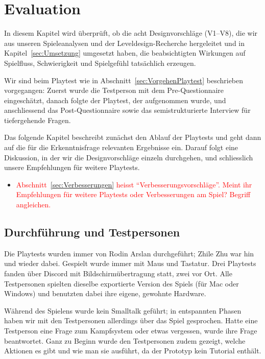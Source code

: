 \documentclass[../Main.tex]{subfiles}
\begin{document}
\section{Evaluation} \label{sec:Evaluation}

In diesem Kapitel wird überprüft, ob die acht Designvorschläge (V1--V8), die wir aus unseren Spieleanalysen und der Leveldesign-Recherche hergeleitet und in Kapitel~\ref{sec:Umsetzung} umgesetzt haben, die beabsichtigten Wirkungen auf Spielfluss, Schwierigkeit und Spielgefühl tatsächlich erzeugen.

Wir sind beim Playtest wie in Abschnitt~\ref{sec:VorgehenPlaytest} beschrieben vorgegangen: Zuerst wurde die Testperson mit dem Pre-Questionnaire eingeschätzt, danach folgte der Playtest, der aufgenommen wurde, und anschliessend das Post-Questionnaire sowie das semistrukturierte Interview für tiefergehende Fragen.

Das folgende Kapitel beschreibt zunächst den Ablauf der Playtests und geht dann auf die für die Erkenntnisfrage relevanten Ergebnisse ein. Darauf folgt eine Diskussion, in der wir die Designvorschläge einzeln durchgehen, und schliesslich unsere Empfehlungen für weitere Playtests.

\begin{itemize}[leftmargin=1.5cm]
    \item \textcolor{red}{Abschnitt~\ref{sec:Verbesserungen} heisst \enquote{Verbesserungsvorschläge}. Meint ihr Empfehlungen für weitere Playtests oder Verbesserungen am Spiel? Begriff angleichen.}
\end{itemize}

\subsection{Durchführung und Testpersonen} \label{sec:Durchfuehrung}

Die Playtests wurden immer von Rodin Arslan durchgeführt; Zhile Zhu war hin und wieder dabei. Gespielt wurde immer mit Maus und Tastatur. Drei Playtests fanden über Discord mit Bildschirmübertragung statt, zwei vor Ort. Alle Testpersonen spielten dieselbe exportierte Version des Spiels (für Mac oder Windows) und benutzten dabei ihre eigene, gewohnte Hardware.

Während des Spielens wurde kein Smalltalk geführt; in entspannten Phasen haben wir mit den Testpersonen allerdings über das Spiel gesprochen. Hatte eine Testperson eine Frage zum Kampfsystem oder etwas vergessen, wurde ihre Frage beantwortet. Ganz zu Beginn wurde den Testpersonen zudem gezeigt, welche Aktionen es gibt und wie man sie ausführt, da der Prototyp kein Tutorial enthält.
\end{document}

